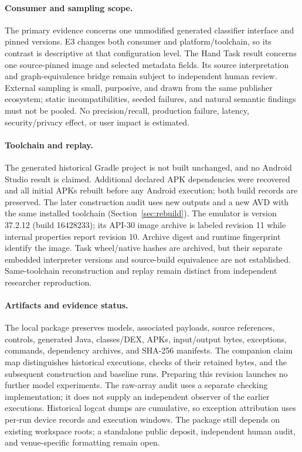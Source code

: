 \documentclass[10pt,twocolumn,letterpaper]{article}
\begin{document}
\paragraph{Consumer and sampling scope.}
The primary evidence concerns one unmodified generated classifier interface and pinned versions. E3 changes both consumer and platform/toolchain, so its contrast is descriptive at that configuration level. The Hand Task result concerns one source-pinned image and selected metadata fields. Its source interpretation and graph-equivalence bridge remain subject to independent human review. External sampling is small, purposive, and drawn from the same publisher ecosystem; static incompatibilities, seeded failures, and natural semantic findings must not be pooled. No precision/recall, production failure, latency, security/privacy effect, or user impact is estimated.

\paragraph{Toolchain and replay.}
The generated historical Gradle project is not built unchanged, and no Android Studio result is claimed. Additional declared APK dependencies were recovered and all initial APKs rebuilt before any Android execution; both build records are preserved. The later construction audit uses new outputs and a new AVD with the same installed toolchain (Section~\ref{sec:rebuild}). The emulator is version 37.2.12 (build 16428233); its API-30 image archive is labeled revision 11 while internal properties report revision 10. Archive digest and runtime fingerprint identify the image. Task wheel/native hashes are archived, but their separate embedded interpreter versions and source-build equivalence are not established. Same-toolchain reconstruction and replay remain distinct from independent researcher reproduction.

\paragraph{Artifacts and evidence status.}
The local package preserves models, associated payloads, source references, controls, generated Java, classes/DEX, APKs, input/output bytes, exceptions, commands, dependency archives, and SHA-256 manifests. The companion claim map distinguishes historical executions, checks of their retained bytes, and the subsequent construction and baseline runs. Preparing this revision launches no further model experiments. The raw-array audit uses a separate checking implementation; it does not supply an independent observer of the earlier executions. Historical logcat dumps are cumulative, so exception attribution uses per-run device records and execution windows. The package still depends on existing workspace roots; a standalone public deposit, independent human audit, and venue-specific formatting remain open.
\end{document}
